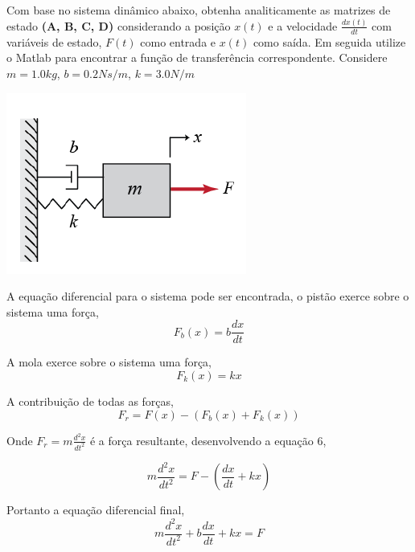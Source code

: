 \documentclass[paper=a4, fontsize=11pt]{article}
\begin{document}
\begin{list}{\textbf{Questão .}}{
\setlength{\labelwidth}{-2mm} \setlength{\parsep}{0mm}
\setlength{\topsep}{0mm} \setlength{\leftmargin}{0mm}}
\newpage
\item
  Com base no sistema dinâmico abaixo, obtenha 
  analiticamente as matrizes de estado
  \textbf{(A, B, C, D)} considerando a posição $x(t)$ e a 
  velocidade $\frac{d x(t)}{dt}$ com variáveis 
  de estado, $F(t)$ como entrada e $x(t)$ como saída. Em 
  seguida utilize o Matlab para encontrar a função 
  de transferência correspondente.
  Considere $m=1.0 kg$, $b=0.2 N s/m$, $k=3.0 N/m$

            \begin{center}
            \includegraphics[scale=0.6]{fig6a.png}
            \end{center}
 

         A equação diferencial para o sistema pode ser encontrada, o pistão 
         exerce sobre o sistema uma força, 
         \begin{equation}
             F_b(x) = b \frac{d x}{d t}
         \end{equation}

         A mola exerce sobre o sistema uma força,
         \begin{equation}
             F_k(x) = k x
         \end{equation}

         A contribuição de todas as forças,
        \begin{equation}
            F_r = F(x) - (F_b(x) + F_k(x))
        \end{equation}

        Onde $F_r = m \frac{d^2 x}{d t^2}$ é a força resultante, desenvolvendo a equação 6,

        $$ 
        m \frac{d^2 x}{d t^2} = F - \left(\frac{d x}{d t} + k x\right)
        $$

         Portanto a equação diferencial final, 
        \begin{equation} 
            m \frac{d^2 x}{d t^2} +  b \frac{d x}{d t} + k x = F
        \end{equation}


\end{list}
\end{document}
